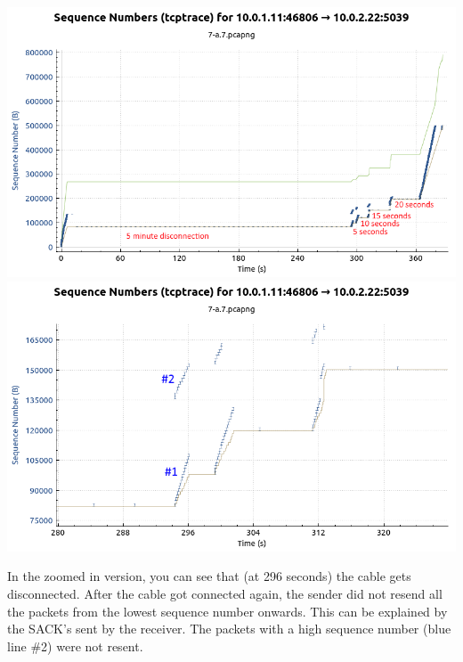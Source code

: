 \includegraphics[width=\textwidth]{traces/7-a_7_tcptrace}
\includegraphics[width=\textwidth]{traces/7-a_7_tcptrace_zoomedin}

In the zoomed in version, you can see that (at 296 seconds) the cable gets disconnected. After the cable got connected again, the sender did not resend all the packets from the lowest sequence number onwards. This can be explained by the SACK's sent by the receiver. The packets with a high sequence number (blue line \#2) were not resent.
